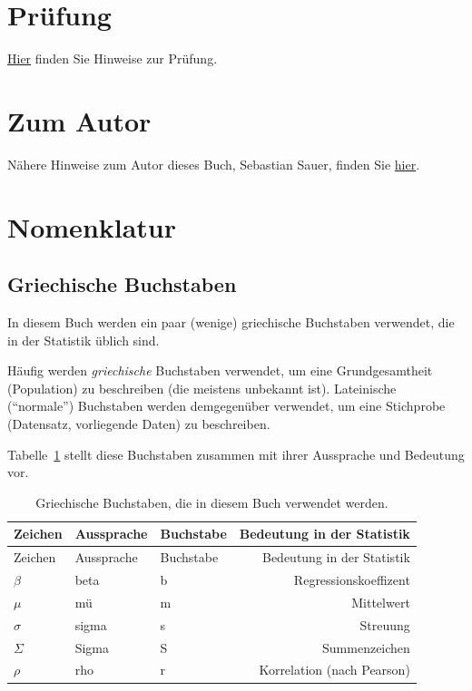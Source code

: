 \documentclass[
  a4paper,
  DIV=11]{scrreprt}
\theoremstyle{definition}
\theoremstyle{definition}
\theoremstyle{definition}
\theoremstyle{remark}
\begin{document}
\section{Prüfung}\label{pruxfcfung}

\href{https://hinweisbuch.netlify.app/hinweise-pruefung-prognosewettbewerb-frame}{Hier}
finden Sie Hinweise zur Prüfung.

\section{Zum Autor}\label{zum-autor}

Nähere Hinweise zum Autor dieses Buch, Sebastian Sauer, finden Sie
\href{https://sebastiansauer-academic.netlify.app/}{hier}.

\section{Nomenklatur}\label{nomenklatur}

\subsection{Griechische Buchstaben}\label{sec-greek}

In diesem Buch werden ein paar (wenige) griechische Buchstaben
verwendet, die in der Statistik üblich sind.

Häufig werden \emph{griechische} Buchstaben verwendet, um eine
Grundgesamtheit (Population) zu beschreiben (die meistens unbekannt
ist). Lateinische (``normale'') Buchstaben werden demgegenüber
verwendet, um eine Stichprobe (Datensatz, vorliegende Daten) zu
beschreiben.

Tabelle~\ref{tbl-griech} stellt diese Buchstaben zusammen mit ihrer
Aussprache und Bedeutung vor.

\begin{longtable}[]{@{}lllr@{}}
\caption{Griechische Buchstaben, die in diesem Buch verwendet
werden.}\label{tbl-griech}\tabularnewline
\toprule\noalign{}
Zeichen & Aussprache & Buchstabe & Bedeutung in der Statistik \\
\midrule\noalign{}
\endfirsthead
\toprule\noalign{}
Zeichen & Aussprache & Buchstabe & Bedeutung in der Statistik \\
\midrule\noalign{}
\endhead
\bottomrule\noalign{}
\endlastfoot
\(\beta\) & beta & b & Regressionskoeffizent \\
\(\mu\) & mü & m & Mittelwert \\
\(\sigma\) & sigma & s & Streuung \\
\(\Sigma\) & Sigma & S & Summenzeichen \\
\(\rho\) & rho & r & Korrelation (nach Pearson) \\
\end{longtable}
\end{document}
